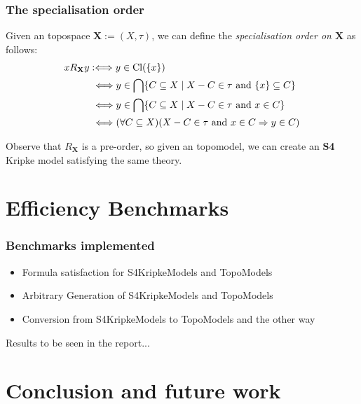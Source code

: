 \documentclass[
	11pt, %
	aspectratio=1610, %
]{beamer}
\begin{document}
\begin{frame}
	\frametitle{The specialisation order}

	Given an topospace $\mathbf{X} := (X, \tau)$, we can define the \emph{specialisation order on $\mathbf{X}$} as follows:
	\begin{align*}
		xR_{\mathbf{X}}y &:\Longleftrightarrow y \in \text{Cl}(\{x\}) \\
		                 &~\Longleftrightarrow y \in \bigcap \{ C \subseteq X \mid  X-C \in \tau \text{ and } \{x\} \subseteq C \} \\
		                 &~\Longleftrightarrow y \in \bigcap \{ C \subseteq X \mid  X-C \in \tau \text{ and } x \in C \} \\
		                 &~\Longleftrightarrow (\forall C \subseteq X)(X-C \in \tau \text{ and } x \in C \Rightarrow y \in C)
	\end{align*}

	\bigskip

	Observe that $R_{\mathbf{X}}$ is a pre-order, so given an topomodel, we can create an \textbf{S4} Kripke model satisfying the same theory.

\end{frame}


\section{Efficiency Benchmarks}


\begin{frame}
	\frametitle{Benchmarks implemented}

	\begin{itemize}
		\item Formula satisfaction for S4KripkeModels and TopoModels
		\item Arbitrary Generation of S4KripkeModels and TopoModels
		\item Conversion from S4KripkeModels to TopoModels and the other way
	\end{itemize}

	Results to be seen in the report...
\end{frame}

\section{Conclusion and future work}
\end{document}
